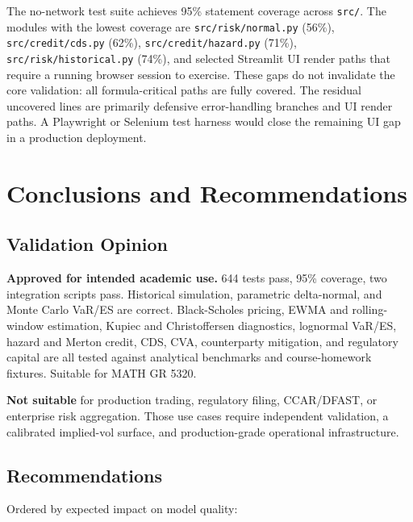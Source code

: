 \documentclass[11pt]{article}
\newcommand{\code}[1]{\texttt{#1}}
\begin{document}
The no-network test suite achieves 95\% statement coverage across \code{src/}.
The modules with the lowest coverage are \code{src/risk/normal.py} (56\%),
\code{src/credit/cds.py} (62\%), \code{src/credit/hazard.py} (71\%),
\code{src/risk/historical.py} (74\%), and selected Streamlit UI render paths
that require a running browser session to exercise.  These gaps do not
invalidate the core validation: all formula-critical paths are fully covered.
The residual uncovered lines are primarily defensive error-handling branches and
UI render paths.  A Playwright or Selenium test harness would close the
remaining UI gap in a production deployment.

\section{Conclusions and Recommendations}
\label{sec:conclusions}

\subsection{Validation Opinion}

\textbf{Approved for intended academic use.}  644 tests pass, 95\%
coverage, two integration scripts pass.  Historical simulation,
parametric delta-normal, and Monte Carlo VaR/ES are correct.
Black-Scholes pricing, EWMA and rolling-window estimation, Kupiec and
Christoffersen diagnostics, lognormal VaR/ES, hazard and Merton credit,
CDS, CVA, counterparty mitigation, and regulatory capital are all tested
against analytical benchmarks and course-homework fixtures.  Suitable
for MATH GR 5320.

\textbf{Not suitable} for production trading, regulatory filing,
CCAR/DFAST, or enterprise risk aggregation.  Those use cases require
independent validation, a calibrated implied-vol surface, and
production-grade operational infrastructure.

\subsection{Recommendations}

Ordered by expected impact on model quality:
\end{document}
